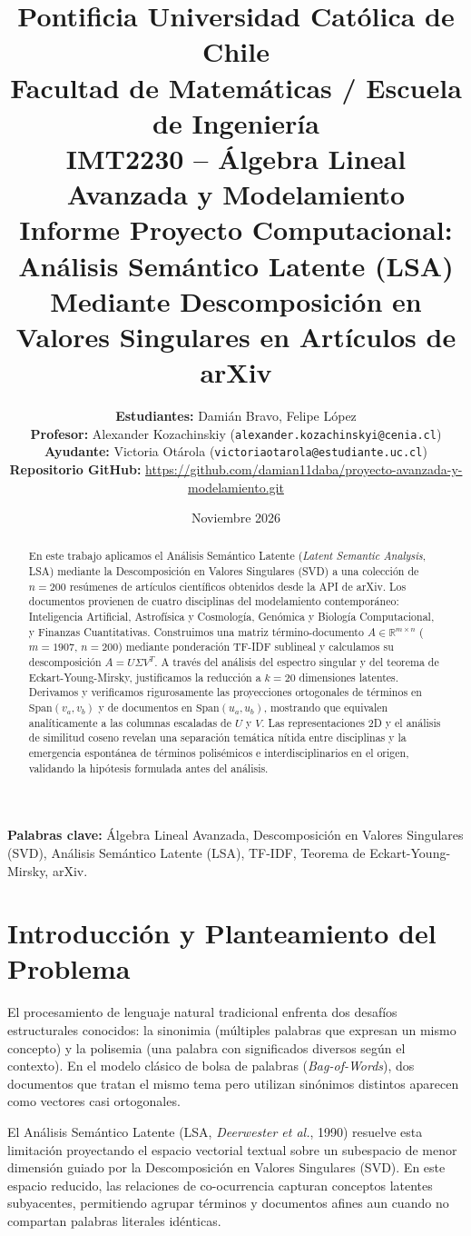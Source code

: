 \documentclass[11pt,a4paper]{article}
\title{\vspace{-1.5cm}
\textbf{Pontificia Universidad Católica de Chile}\\
\large Facultad de Matemáticas / Escuela de Ingeniería\\
\large IMT2230 -- Álgebra Lineal Avanzada y Modelamiento\\[0.5cm]
\LARGE \textbf{Informe Proyecto Computacional:\\Análisis Semántico Latente (LSA) Mediante Descomposición en Valores Singulares en Artículos de arXiv}
}
\author{
\textbf{Estudiantes:} Damián Bravo, Felipe López\\
\textbf{Profesor:} Alexander Kozachinskiy \quad (\texttt{alexander.kozachinskyi@cenia.cl})\\
\textbf{Ayudante:} Victoria Otárola \quad (\texttt{victoriaotarola@estudiante.uc.cl})\\[0.3cm]
\textbf{Repositorio GitHub:} \url{https://github.com/damian11daba/proyecto-avanzada-y-modelamiento.git}
}
\date{Noviembre 2026}
\begin{document}
\maketitle

\begin{abstract}
En este trabajo aplicamos el Análisis Semántico Latente (\textit{Latent Semantic Analysis}, LSA) mediante la Descomposición en Valores Singulares (SVD) a una colección de $n = 200$ resúmenes de artículos científicos obtenidos desde la API de arXiv. Los documentos provienen de cuatro disciplinas del modelamiento contemporáneo: Inteligencia Artificial, Astrofísica y Cosmología, Genómica y Biología Computacional, y Finanzas Cuantitativas. Construimos una matriz término-documento $A \in \mathbb{R}^{m \times n}$ ($m = 1907$, $n = 200$) mediante ponderación TF-IDF sublineal y calculamos su descomposición $A = U \Sigma V^T$. A través del análisis del espectro singular y del teorema de Eckart-Young-Mirsky, justificamos la reducción a $k = 20$ dimensiones latentes. Derivamos y verificamos rigurosamente las proyecciones ortogonales de términos en $\text{Span}(v_a, v_b)$ y de documentos en $\text{Span}(u_a, u_b)$, mostrando que equivalen analíticamente a las columnas escaladas de $U$ y $V$. Las representaciones 2D y el análisis de similitud coseno revelan una separación temática nítida entre disciplinas y la emergencia espontánea de términos polisémicos e interdisciplinarios en el origen, validando la hipótesis formulada antes del análisis.
\end{abstract}

\vspace{0.3cm}
\noindent\textbf{Palabras clave:} Álgebra Lineal Avanzada, Descomposición en Valores Singulares (SVD), Análisis Semántico Latente (LSA), TF-IDF, Teorema de Eckart-Young-Mirsky, arXiv.

\section{Introducción y Planteamiento del Problema}
El procesamiento de lenguaje natural tradicional enfrenta dos desafíos estructurales conocidos: la sinonimia (múltiples palabras que expresan un mismo concepto) y la polisemia (una palabra con significados diversos según el contexto). En el modelo clásico de bolsa de palabras (\textit{Bag-of-Words}), dos documentos que tratan el mismo tema pero utilizan sinónimos distintos aparecen como vectores casi ortogonales.

El Análisis Semántico Latente (LSA, \textit{Deerwester et al.}, 1990) resuelve esta limitación proyectando el espacio vectorial textual sobre un subespacio de menor dimensión guiado por la Descomposición en Valores Singulares (SVD). En este espacio reducido, las relaciones de co-ocurrencia capturan conceptos latentes subyacentes, permitiendo agrupar términos y documentos afines aun cuando no compartan palabras literales idénticas.
\end{document}
